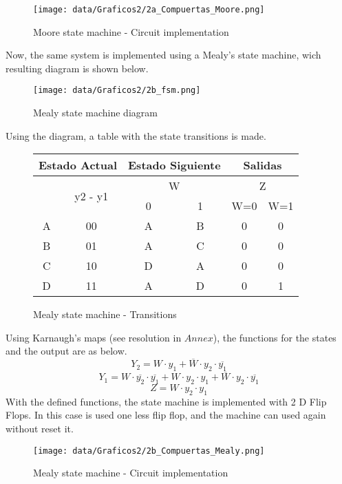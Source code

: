 \begin{figure}[H]
    \begin{centering}
    \texttt{[image: data/Graficos2/2a\_Compuertas\_Moore.png]}
    \par\end{centering}
    \caption{Moore state machine  - Circuit implementation}
\end{figure}

Now, the same system is implemented using a Mealy's 
state machine, wich resulting diagram is shown below.

\begin{figure}[H]
    \begin{centering}
    \texttt{[image: data/Graficos2/2b\_fsm.png]}
    \par\end{centering}
    \caption{Mealy state machine diagram}
\end{figure}

Using the diagram, a table with the state 
transitions is made.
\begin{figure}[H]
    \begin{center}
\begin{tabular}{|c|c|c|c||c|c|}
    \hline 
    \multicolumn{2}{|c|}{Estado Actual} & \multicolumn{2}{c||}{Estado Siguiente} & \multicolumn{2}{c|}{Salidas}\tabularnewline
    \hline 
    \hline 
    \multirow{2}{*}{} & \multirow{2}{*}{y2 - y1} & \multicolumn{2}{c||}{W} & \multicolumn{2}{c|}{Z}\tabularnewline
    \cline{3-6} 
     &  & \multicolumn{1}{c|}{0} & \multicolumn{1}{c||}{1} & W=0 & W=1\tabularnewline
    \hline 
    A & 00 & A & B & 0 & 0\tabularnewline
    \hline 
    B & 01 & A & C & 0 & 0\tabularnewline
    \hline 
    C & 10 & D & A & 0 & 0\tabularnewline
    \hline 
    D & 11 & A & D & 0 & 1\tabularnewline
    \hline 
    \end{tabular}
    \caption{Mealy state machine - Transitions}
\end{center}
\end{figure}

Using Karnaugh's maps (see resolution in $Annex$), the functions for the 
states and the output are as below.
$$Y_2 = W \cdot y_1 + \overline{W} \cdot y_2 \cdot \overline{y_1}$$ 
$$Y_1 = W \cdot \overline{y_2} \cdot \overline{y_1} + W \cdot y_2 \cdot y_1 + \overline{W} \cdot y_2 \cdot \overline{y_1}$$
$$Z = W \cdot y_2 \cdot y_1$$
With the defined functions, the state machine 
is implemented with 2 D Flip Flops. In this case
is used one less flip flop, and the machine can
used again without reset it.

\begin{figure}[H]
    \begin{centering}
    \texttt{[image: data/Graficos2/2b\_Compuertas\_Mealy.png]}
    \par\end{centering}
    \caption{Mealy state machine - Circuit implementation}
\end{figure}

